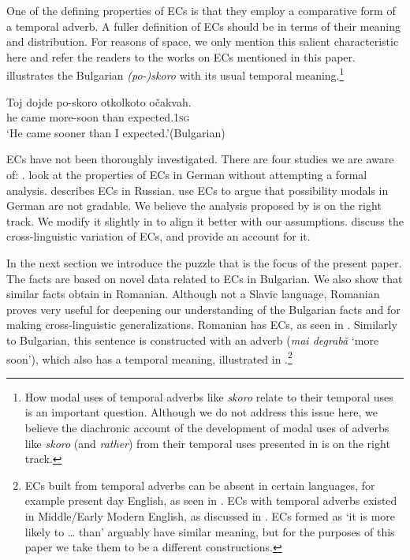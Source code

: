 \documentclass[output=paper,
]{langscibook}
\begin{document}
One of the defining properties of ECs is that they employ a comparative form of a temporal adverb. A fuller definition of ECs should be in terms of their meaning and distribution. For reasons of space, we only mention this salient characteristic here and refer the readers to the works on ECs mentioned in this paper.  illustrates the Bulgarian \textit{(po-)}\textit{skoro} with its usual temporal meaning.\footnote{How modal uses of temporal adverbs like \textit{skoro} relate to their temporal uses is an important question. Although we do not address this issue here, we believe the diachronic account of the development of modal uses of adverbs like \textit{skoro} (and \textit{rather}) from their temporal uses presented in \citet{ger16} is on the right track.
}

	\ea \gll Toj dojde	po-skoro	otkolkoto očakvah.\\
	he came	more-soon than expected.\textsc{1sg} \\		
 	\glt `He came sooner than I expected.'\hfill (Bulgarian) \label{skoro}
	\z

\noindent ECs have not been thoroughly investigated. There are four studies we are aware of: \citet{finkra14,herrub14,gon14,goniri17a}. \citet{finkra14} look at the properties  of ECs in German without attempting a formal analysis. \citet{gon14} describes ECs in Russian. \citet{herrub14} use  ECs to argue that possibility modals in German are not gradable. We believe the analysis proposed by \citet{herrub14} is on the right track. We modify it slightly in   to align it better with our assumptions. \citet{goniri17a} discuss the cross-linguistic variation of ECs, and provide an account for it. 

In the next section we introduce the  puzzle that is the focus of the present paper. The facts are based on novel  data related to ECs in Bulgarian. We also show that similar facts obtain in Romanian{.} Although not a Slavic language, Romanian proves very useful for deepening our understanding of the Bulgarian facts and for making cross-linguistic generalizations. Romanian has ECs, as seen in . Similarly to Bulgarian, this sentence is constructed with an adverb (\textit{mai degrabă} `more soon'), which also has a temporal meaning, illustrated in .\footnote{ECs built from temporal adverbs can be  absent in certain languages, for example present day English, as seen in . ECs with temporal adverbs existed in Middle/Early Modern English, as discussed in \citet{ger16}. ECs formed as `it is more likely to {\ldots} than' arguably have similar meaning, but for the purposes of this paper we take them to be a different constructions.

 	\z
 	}
\end{document}
